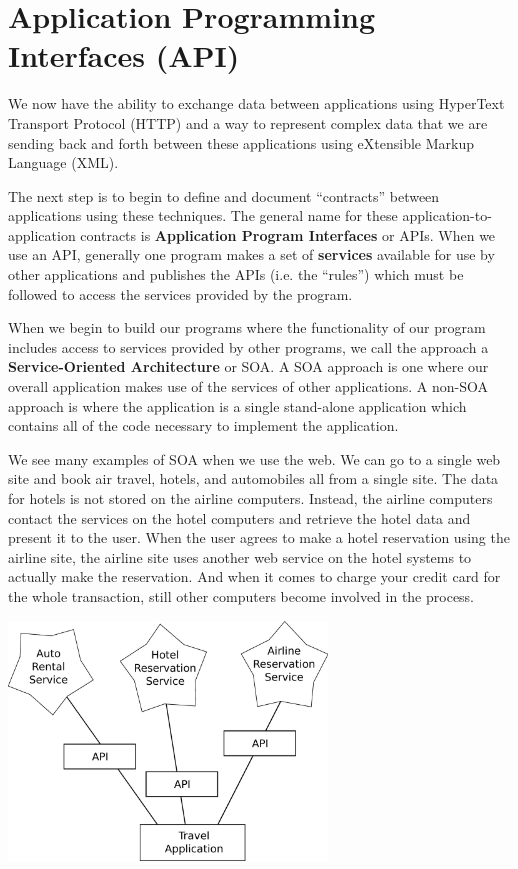 \documentclass[10pt]{book}
\begin{document}
\section{Application Programming Interfaces (API)}

We now have the ability to exchange data between applications using HyperText
Transport Protocol (HTTP) and a way to represent complex data that we are 
sending back and forth between these applications using eXtensible 
Markup Language (XML).

The next step is to begin to define and document ``contracts'' between 
applications using these techniques. The general name for these 
application-to-application contracts is {\bf Application Program 
Interfaces} or APIs.  When we use an API, generally one program
makes a set of {\bf services} available for use by other applications
and publishes the APIs (i.e. the ``rules'') which must be followed to 
access the services provided by the program.

When we begin to build our programs where the functionality of
our program includes access to services provided by other programs, 
we call the approach a {\bf Service-Oriented Architecture} or SOA.
A SOA approach is one where our overall application makes use of 
the services of other applications.  A non-SOA approach is where the
application is a single stand-alone application which contains all of the
code necessary to implement the application.

We see many examples of SOA when we use the web.  We can go to a single 
web site and book air travel, hotels, and automobiles all from a 
single site.  The data for hotels is not stored on the airline computers. 
Instead, the airline computers contact the services on the hotel computers
and retrieve the hotel data and present it to the user.  When the user
agrees to make a hotel reservation using the airline site, the airline site uses
another web service on the hotel systems to actually make the reservation.
And when it comes to charge your credit card for the whole transaction, 
still other computers become involved in the process.

\beforefig
\centerline{\includegraphics[height=2.50in]{figs2/soa.eps}}
\afterfig
\end{document}

